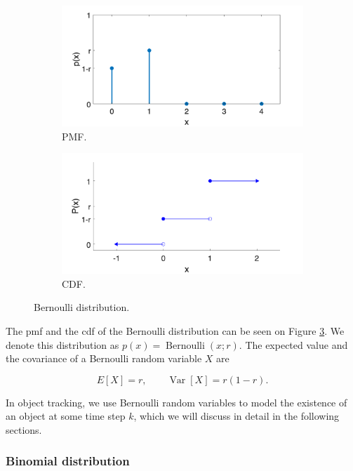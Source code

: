 \begin{figure}
\centering
\begin{subfigure}{.5\textwidth}
  \centering
  \includegraphics[width=.9\linewidth]{figures/bern.pmf.png}
  \caption{PMF.}
  \label{fig:bern:pmf}
\end{subfigure}%
\begin{subfigure}{.5\textwidth}
  \centering
  \includegraphics[width=.9\linewidth]{figures/bern.cdf.png}
  \caption{CDF.}
  \label{fig:bern:cdf}
\end{subfigure}
\caption{Bernoulli distribution.}
\label{fig:bern}
\end{figure}

The pmf and the cdf of the Bernoulli distribution can be seen on Figure \ref{fig:bern}.
We denote this distribution as $p(x) = \operatorname{Bernoulli}(x;r)$.
The expected value and the covariance of a Bernoulli random variable $X$ are

$$
E[X] = r, \qquad \operatorname{Var}[X] = r(1-r).
$$

In object tracking, we use Bernoulli random variables to model the existence of
an object at some time step $k$, which we will discuss in detail in the following
sections.

\subsubsection{Binomial distribution}

